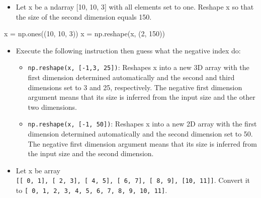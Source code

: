 \documentclass[11pt]{article}
\providecommand{\tightlist}{%
      \setlength{\itemsep}{0pt}\setlength{\parskip}{0pt}}
\newenvironment{Shaded}{}{}
\newcommand{\DecValTok}[1]{\textcolor[rgb]{0.25,0.63,0.44}{{#1}}}
\newcommand{\NormalTok}[1]{{#1}}
\newcommand{\OperatorTok}[1]{\textcolor[rgb]{0.40,0.40,0.40}{{#1}}}
\begin{document}
  \begin{itemize}
  \tightlist
  \item
    Let x be a ndarray {[}10, 10, 3{]} with all elements set to one.
    Reshape x so that the size of the second dimension equals 150.
  \end{itemize}

\begin{Shaded}
\begin{tcolorbox}[breakable, size=fbox, boxrule=1pt, pad at break*=1mm,colback=cellbackground, colframe=cellborder]
  \begin{Highlighting}[]
\NormalTok{x }\OperatorTok{=}\NormalTok{ np.ones((}\DecValTok{10}\NormalTok{, }\DecValTok{10}\NormalTok{, }\DecValTok{3}\NormalTok{))}
\NormalTok{x }\OperatorTok{=}\NormalTok{ np.reshape(x, (}\DecValTok{2}\NormalTok{, }\DecValTok{150}\NormalTok{))}
\end{Highlighting}
\end{tcolorbox}
\end{Shaded}

  \begin{itemize}
  \item
    Execute the following instruction then guess what the negative index do:

    \begin{itemize}
    \tightlist
    \item
      \texttt{np.reshape(x,\ {[}-1,3,\ 25{]})}: Reshapes x into a new 3D
      array with the first dimension determined automatically and the
      second and third dimensions set to 3 and 25, respectively. The
      negative first dimension argument means that its size is inferred
      from the input size and the other two dimensions.
    \item
      \texttt{np.reshape(x,\ {[}-1,\ 50{]})}: Reshapes x into a new 2D
      array with the first dimension determined automatically and the
      second dimension set to 50. The negative first dimension argument
      means that its size is inferred from the input size and the second
      dimension.
    \end{itemize}
  \item
    Let x be array
    \texttt{{[}{[}\ 0,\ 1{]},\ {[}\ 2,\ 3{]},\ {[}\ 4,\ 5{]},\ {[}\ 6,\ 7{]},\ {[}\ 8,\ 9{]},\ {[}10,\ 11{]}{]}}.
    Convert it to
    \texttt{{[}\ 0,\ 1,\ 2,\ 3,\ 4,\ 5,\ 6,\ 7,\ 8,\ 9,\ 10,\ 11{]}}.
  \end{itemize}
\end{document}
